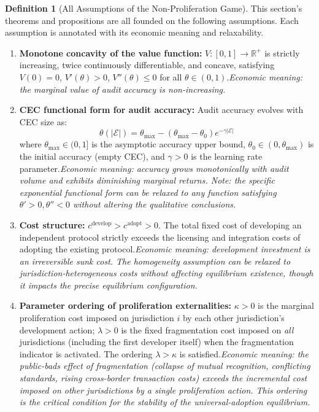 \documentclass[12pt,a4paper]{article}
\theoremstyle{definition}
\newtheorem{definition}{Definition}[section]
\theoremstyle{remark}
\begin{document}
\begin{definition}[All Assumptions of the Non-Proliferation Game]
\label{def:assumptions-npe}
This section's theorems and propositions are all founded on the following assumptions. Each assumption is annotated with its economic meaning and relaxability.

\begin{enumerate}[label=\textbf{A\arabic*}, leftmargin=*, itemsep=4pt]
\item \textbf{Monotone concavity of the value function:} $V: [0,1] \to \mathbb{R}^+$ is strictly increasing, twice continuously differentiable, and concave, satisfying $V(0) = 0$, $V'(\theta) > 0$, $V''(\theta) \leq 0$ for all $\theta \in (0,1)$.\hfill\textit{Economic meaning: the marginal value of audit accuracy is non-increasing.}

\item \textbf{CEC functional form for audit accuracy:} Audit accuracy evolves with CEC size as:
\begin{equation}
\theta(|\mathcal{E}|) = \theta_{\max} - (\theta_{\max} - \theta_0) e^{-\gamma |\mathcal{E}|}
\end{equation}
where $\theta_{\max} \in (0,1]$ is the asymptotic accuracy upper bound, $\theta_0 \in (0, \theta_{\max})$ is the initial accuracy (empty CEC), and $\gamma > 0$ is the learning rate parameter.\hfill\textit{Economic meaning: accuracy grows monotonically with audit volume and exhibits diminishing marginal returns. Note: the specific exponential functional form can be relaxed to any function satisfying $\theta' > 0, \theta'' < 0$ without altering the qualitative conclusions.}

\item \textbf{Cost structure:} $c^{\text{develop}} > c^{\text{adopt}} > 0$. The total fixed cost of developing an independent protocol strictly exceeds the licensing and integration costs of adopting the existing protocol.\hfill\textit{Economic meaning: development investment is an irreversible sunk cost. The homogeneity assumption can be relaxed to jurisdiction-heterogeneous costs without affecting equilibrium existence, though it impacts the precise equilibrium configuration.}

\item \textbf{Parameter ordering of proliferation externalities:} $\kappa > 0$ is the marginal proliferation cost imposed on jurisdiction $i$ by each other jurisdiction's development action; $\lambda > 0$ is the fixed fragmentation cost imposed on \textit{all} jurisdictions (including the first developer itself) when the fragmentation indicator is activated. The ordering $\lambda > \kappa$ is satisfied.\hfill\textit{Economic meaning: the public-bads effect of fragmentation (collapse of mutual recognition, conflicting standards, rising cross-border transaction costs) exceeds the incremental cost imposed on other jurisdictions by a single proliferation action. This ordering is the critical condition for the stability of the universal-adoption equilibrium.}


\end{enumerate}
\end{definition}
\end{document}
